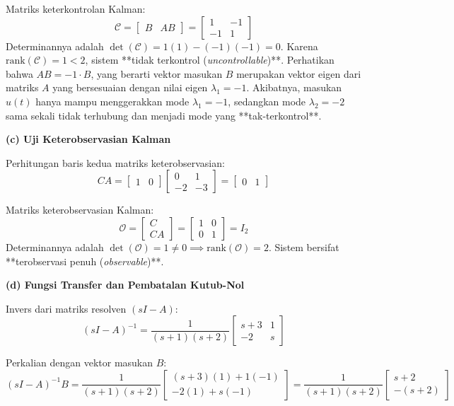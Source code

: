 \documentclass[11pt,a4paper]{article}
\begin{document}
Matriks keterkontrolan Kalman:
$$\mathcal{C} = \begin{bmatrix} B & AB \end{bmatrix} = \begin{bmatrix} 1 & -1 \\ -1 & 1 \end{bmatrix}$$
Determinannya adalah $\det(\mathcal{C}) = 1(1) - (-1)(-1) = 0$.
Karena $\text{rank}(\mathcal{C}) = 1 < 2$, sistem **tidak terkontrol (\textit{uncontrollable})**.
Perhatikan bahwa $AB = -1 \cdot B$, yang berarti vektor masukan $B$ merupakan vektor eigen dari matriks $A$ yang bersesuaian dengan nilai eigen $\lambda_1 = -1$. Akibatnya, masukan $u(t)$ hanya mampu menggerakkan mode $\lambda_1 = -1$, sedangkan mode $\lambda_2 = -2$ sama sekali tidak terhubung dan menjadi mode yang **tak-terkontrol**.

\textbf{(c) Uji Keterobservasian Kalman}

Perhitungan baris kedua matriks keterobservasian:
$$CA = \begin{bmatrix} 1 & 0 \end{bmatrix} \begin{bmatrix} 0 & 1 \\ -2 & -3 \end{bmatrix} = \begin{bmatrix} 0 & 1 \end{bmatrix}$$

Matriks keterobservasian Kalman:
$$\mathcal{O} = \begin{bmatrix} C \\ CA \end{bmatrix} = \begin{bmatrix} 1 & 0 \\ 0 & 1 \end{bmatrix} = I_2$$
Determinannya adalah $\det(\mathcal{O}) = 1 \ne 0 \implies \text{rank}(\mathcal{O}) = 2$.
Sistem bersifat **terobservasi penuh (\textit{observable})**.

\textbf{(d) Fungsi Transfer dan Pembatalan Kutub-Nol}

Invers dari matriks resolven $(sI - A)$:
$$(sI - A)^{-1} = \frac{1}{(s+1)(s+2)} \begin{bmatrix} s + 3 & 1 \\ -2 & s \end{bmatrix}$$

Perkalian dengan vektor masukan $B$:
$$(sI - A)^{-1} B = \frac{1}{(s+1)(s+2)} \begin{bmatrix} (s + 3)(1) + 1(-1) \\ -2(1) + s(-1) \end{bmatrix} = \frac{1}{(s+1)(s+2)} \begin{bmatrix} s + 2 \\ -(s + 2) \end{bmatrix}$$
\end{document}
